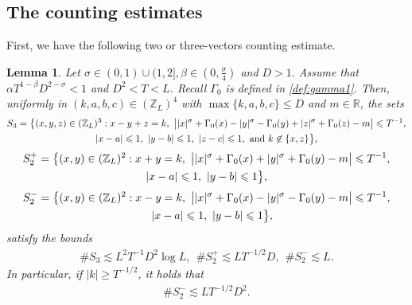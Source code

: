 \documentclass[UTF-8,reqno]{amsart}
\numberwithin{equation}{section}
\newtheorem{lemma}[theorem]{Lemma}
\theoremstyle{definition}
\def\geq{\geqslant}
\def\leq{\leqslant}
\def\geq{\geqslant}
\def\leq{\leqslant}
\begin{document}
\subsection{The counting estimates}
 First, we have the following  two or three-vectors counting estimate.
\begin{lemma}\label{counting} Let $\sigma\in(0,1)\cup (1,2],\beta\in(0,\frac\sigma4)$ and  $D>1.$ Assume that $\alpha T^{1-\beta}D^{2-\sigma}<1$ and $D^2<T < L$.  Recall $\Gamma_0$ is defined in \eqref{def:gamma1}. Then, uniformly in $(k,a,b,c)\in(\mathbb{Z}_L)^4$ with $\max\{k,a,b,c\}\leq D$ and $m\in\mathbb{R}$, the sets
\begin{multline}%
S_3=\big\{(x,y,z)\in (\mathbb{Z}_L)^3:x-y+z=k,\,\,\big||x|^\sigma+\Gamma_0(x)-|y|^\sigma-\Gamma_0(y)+|z|^\sigma+\Gamma_0(z)-m\big|\leq T^{-1},\\|x-a|\leq 1,\,\,|y-b|\leq 1,\,\,|z-c|\leq 1,\,\,\mathrm{and\ }k\not\in\{x,z\}\big\},\notag
\end{multline}
\begin{multline}%
S_2^+=\big\{(x,y)\in(\mathbb{Z}_L)^2:x+ y=k,\,\,\big||x|^\sigma+\Gamma_0(x)+|y|^\sigma+\Gamma_0(y)-m\big|\leq T^{-1},\\|x-a|\leq 1,\,\,|y-b|\leq 1\big\},\notag
\end{multline}
\begin{multline}%
S_2^-=\big\{(x,y)\in(\mathbb{Z}_L)^2:x- y=k,\,\,\big||x|^\sigma+\Gamma_0(x)-|y|^\sigma-\Gamma_0(y)-m\big|\leq T^{-1},\\\quad|x-a|\leq 1,\,\,|y-b|\leq 1\big\},\notag
\end{multline}satisfy the bounds
\begin{align*}
    \#S_3\lesssim L^{2}T^{-1}D^{2}\log L,\ \  \#S_2^+\lesssim LT^{-1/2}D,\ \  \#S_2^-\lesssim L.
    \end{align*}
    In particular, if $ |k|\geq T^{-1/2}$, it holds that
    \begin{align*}\#S_2^-\lesssim LT^{-1/2}D^{2}.
\end{align*} 
\end{lemma}
\end{document}
